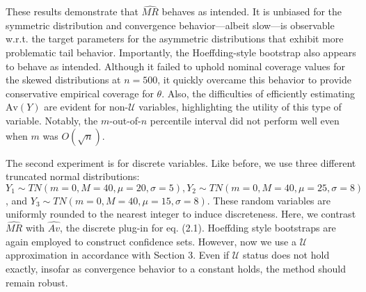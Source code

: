 \documentclass[12pt]{amsart}
\theoremstyle{plain}%
\theoremstyle{definition}
\theoremstyle{remark}
\numberwithin{equation}{section}
\begin{document}
These results demonstrate that $\hat{MR}$ behaves as intended. It is unbiased for the symmetric distribution and convergence behavior---albeit slow---is observable w.r.t. the target parameters for the asymmetric distributions that exhibit more problematic tail behavior. Importantly, the Hoeffding-style bootstrap also appears to behave as intended. Although it failed to uphold nominal coverage values for the skewed distributions at $n=500$, it quickly overcame this behavior to provide conservative empirical coverage for $\theta$. Also, the difficulties of efficiently estimating $\text{Av}(Y)$ are evident for non-$\mathcal{U}$ variables, highlighting the utility of this type of variable. Notably, the $m$-out-of-$n$ percentile interval did not perform well even when $m$ was $O(\sqrt{n})$.

The second experiment is for discrete variables. Like before, we use three different truncated normal distributions: $Y_1 \sim TN(m=0, M=40, \mu = 20, \sigma = 5), Y_2 \sim TN(m=0, M=40, \mu = 25, \sigma = 8)$, and $Y_3 \sim TN(m=0, M=40, \mu = 15, \sigma = 8)$. These random variables are uniformly rounded to the nearest integer to induce discreteness. Here, we contrast $\hat{MR}$ with $\hat{Av}$, the discrete plug-in for eq. (2.1). Hoeffding style bootstraps are again employed to construct confidence sets. However, now we use a $\mathcal{U}$ approximation in accordance with Section 3. Even if $\mathcal{U}$ status does not hold exactly, insofar as convergence behavior to a constant holds, the method should remain robust.
\end{document}
